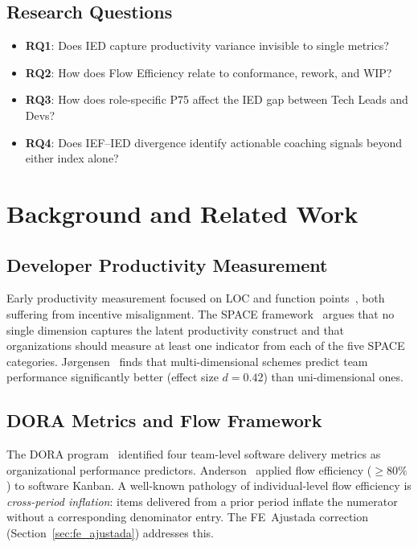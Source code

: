 \documentclass[conference]{IEEEtran}
\begin{document}
\subsection*{Research Questions}

\begin{itemize}
  \item \textbf{RQ1}: Does IED capture productivity variance invisible to single metrics?
  \item \textbf{RQ2}: How does Flow Efficiency relate to conformance, rework, and WIP?
  \item \textbf{RQ3}: How does role-specific P75 affect the IED gap between Tech Leads and Devs?
  \item \textbf{RQ4}: Does IEF--IED divergence identify actionable coaching signals beyond either index alone?
\end{itemize}

\section{Background and Related Work}
\label{sec:background}

\subsection{Developer Productivity Measurement}

Early productivity measurement focused on LOC and function
points~\cite{fenton1997}, both suffering from incentive misalignment.
The SPACE framework~\cite{forsgren2021} argues that no single dimension captures
the latent productivity construct and that organizations should measure at least
one indicator from each of the five SPACE categories.
Jørgensen~\cite{jorgensen2014} finds that multi-dimensional schemes predict team
performance significantly better (effect size $d=0.42$) than uni-dimensional ones.

\subsection{DORA Metrics and Flow Framework}

The DORA program~\cite{forsgren2018} identified four team-level software delivery
metrics as organizational performance predictors. Anderson~\cite{anderson2010}
applied flow efficiency ($\geq 80\%$) to software Kanban.
A well-known pathology of individual-level flow efficiency is \emph{cross-period
inflation}: items delivered from a prior period inflate the numerator without a
corresponding denominator entry. The FE~Ajustada correction
(Section~\ref{sec:fe_ajustada}) addresses this.
\end{document}
